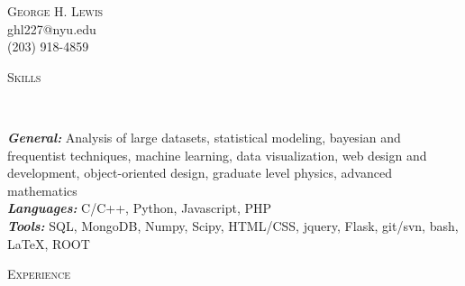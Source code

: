 \documentclass[9pt]{article}
\newenvironment{changemargin}[2]{%
  \begin{list}{}{%
    \setlength{\topsep}{0pt}%
    \setlength{\leftmargin}{#1}%
    \setlength{\rightmargin}{#2}%
    \setlength{\listparindent}{\parindent}%
    \setlength{\itemindent}{\parindent}%
    \setlength{\parsep}{\parskip}%
  }%
  \item[]}{\end{list}
}
\newcommand{\lineover}{
	\begin{changemargin}{-0.05in}{-0.05in}
		\vspace*{-8pt}
		\hrulefill \\
		\vspace*{-2pt}
	\end{changemargin}
}
\newcommand{\header}[1]{
	\begin{changemargin}{-0.5in}{-0.5in}
		\scshape{#1}\\
  	\lineover
	\end{changemargin}
}
\newcommand{\contact}[4]{
	\begin{changemargin}{-0.5in}{-0.5in}
		\begin{center}
			{\Large \scshape {#1}}\\ \smallskip
			{#2}\\ \smallskip 
			{#3}\\ \smallskip
			{#4}\smallskip
		\end{center}
	\end{changemargin}
}
\newenvironment{body} {
	\vspace*{-16pt}
	\begin{changemargin}{-0.25in}{-0.5in}
  }	
	{\end{changemargin}
}
\begin{document}
\contact{George H. Lewis}{ghl227@nyu.edu}{(203) 918-4859}
\smallskip


\smallskip


\header{Skills}

\begin{body}
	\vspace{14pt}
        \emph{\textbf{General:}}{} Analysis of large datasets, statistical modeling, bayesian and frequentist techniques, machine learning, data visualization, web design and development, object-oriented design, graduate level physics, advanced mathematics \\
        \smallskip
	\emph{\textbf{Languages:}}{} C/C++, Python, Javascript, PHP \\
        \smallskip
        \emph{\textbf{Tools:}}{} SQL, MongoDB, Numpy, Scipy, HTML/CSS, jquery, Flask, git/svn, bash, \LaTeX{}, ROOT \\
\end{body}

\smallskip

\header{Experience}
\end{document}
